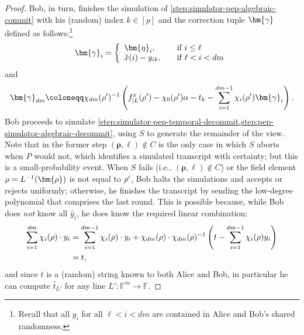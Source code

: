 \documentclass[a4paper,UKenglish,cleveref, autoref, thm-restate]{lipics-v2021}
\theoremstyle{definition}
\newcommand{\field}{\mathbb{F}}
\newcommand{\pcommitlength}{p}
\newcommand{\pcommitstring}{y}
\newcommand{\dimension}{m}
\newcommand{\degree}{d}
\newcommand{\fingerprinttuple}{\bm{\rho}}
\renewcommand{\line}{L}
\def\fe#1{
    \ifnum#1=1
        \alpha
    \else
    \ifnum#1=2
        \beta
    \else
    \ifnum#1=3
        \gamma
    \fi\fi\fi
}
\def\rfe#1{
    \ifnum#1=1
        \rho
    \else
    \ifnum#1=2
        \sigma
    \else
    \fi\fi
}
\begin{document}
\begin{proof}
    Bob, in turn, finishes the simulation of \cref{step:simulator-pep-algebraic-commit} with his (random) index $k \in [\pcommitlength]$ and the correction tuple $\bm{\fe3}$ defined as follows:\footnote{Recall that all $\pcommitstring_i$ for all $\ell < i < \degree\dimension$ are contained in Alice and Bob's shared randomness.}
    \begin{equation*}
        \bm{\fe3}_i = \left\{\begin{array}{ll}\bm{\eta}_i, & \text{if } i \leq \ell \\ \hat x(i) - \pcommitstring_{ik},\quad & \text{if } \ell < i < \degree\dimension\end{array}\right.
    \end{equation*}
    and
    \begin{equation*}
        \bm{\fe3}_{\degree\dimension} \coloneqq \chi_{\degree\dimension}(\rfe1')^{-1} \left(f^x_{|\line}(\rfe1') - \chi_0(\rfe1') \fe1 - t_k - \sum_{i = 1}^{\degree\dimension - 1} \chi_i(\rfe1') \bm{\fe3}_i\right).
    \end{equation*}
    Bob proceeds to simulate \cref{step:simulator-pep-temporal-decommit,step:pep-simulator-algebraic-decommit}, using $S$ to generate the remainder of the view. Note that in the former step $(\fingerprinttuple, \ell) \notin C$ is the only case in which $S$ aborts when $P$ would not, which identifies a simulated transcript with certainty; but this is a small-probability event. When $S$ fails (i.e., $(\fingerprinttuple, \ell) \notin C$) or the field element $\rfe1 = \line^{-1}(\fingerprinttuple)$ is not equal to $\rfe1'$, Bob halts the simulations and accepts or rejects uniformly; otherwise, he finishes the transcript by sending the low-degree polynomial that comprises the last round. This is possible because, while Bob does \emph{not} know all $\hat \pcommitstring_i$, he does know the required linear combination:
    \begin{align*}
        \sum_{i = 1}^{\degree\dimension} \chi_i(\rfe1) \cdot \pcommitstring_i &= \sum_{i = 1}^{\degree\dimension - 1} \chi_i(\rfe1) \cdot \pcommitstring_i + \chi_{\degree\dimension}(\rfe1) \cdot \chi_{\degree\dimension}(\rfe1)^{-1} \left(t - \sum_{i = 1}^{\degree\dimension - 1} \chi_i(\rfe1) \pcommitstring_i\right)\\
        &= t,
    \end{align*}
    and since $t$ is a (random) string known to both Alice and Bob, in particular he can compute $\hat t_{\line'}$ for any line $\line': \field^\dimension \to \field$.
    

\end{proof}
\end{document}
